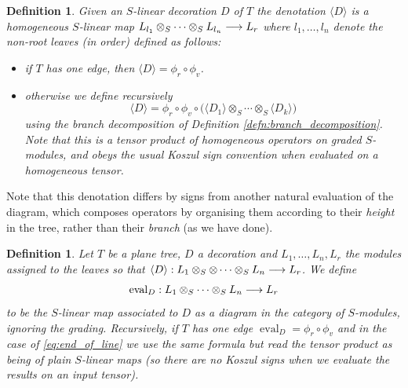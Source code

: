 \documentclass[english,letter paper,12pt,leqno]{article}
\theoremstyle{example}
\newtheorem{definition}[theorem]{Definition}
\numberwithin{equation}{section}
\def\be{\begin{equation}}
\def\ee{\end{equation}}
\begin{document}
\begin{definition} Given an $S$-linear decoration $D$ of $T$ the \emph{denotation} $\langle D \rangle$ is a homogeneous $S$-linear map $L_{l_1} \otimes_S \cdots \otimes_S L_{l_n} \longrightarrow L_r$ where $l_1,\ldots,l_n$ denote the non-root leaves (in order) defined as follows:
\begin{itemize}
\item if $T$ has one edge, then $\langle D \rangle = \phi_r \circ \phi_v$.
\item otherwise we define recursively
\be\label{eq:end_of_line}
\langle D \rangle = \phi_r \circ \phi_v \circ \Big( \langle D_1 \rangle \otimes_S \cdots \otimes_S \langle D_k \rangle \Big)
\ee
using the branch decomposition of Definition \ref{defn:branch_decomposition}. Note that this is a tensor product of homogeneous operators on graded $S$-modules, and obeys the usual Koszul sign convention when evaluated on a homogeneous tensor.
\end{itemize}
\end{definition}

Note that this denotation differs by signs from another natural evaluation of the diagram, which composes operators by organising them according to their \emph{height} in the tree, rather than their \emph{branch} (as we have done).

\begin{definition}\label{defn:evaluation_tree} Let $T$ be a plane tree, $D$ a decoration and $L_1,\ldots,L_n,L_r$ the modules assigned to the leaves so that $\langle D \rangle: L_1 \otimes_S \otimes \cdots \otimes_S L_n \longrightarrow L_r$. We define
\[
\operatorname{eval}_D: L_1 \otimes_S \cdots \otimes_S L_n \longrightarrow L_r
\]
to be the $S$-linear map associated to $D$ as a diagram in the category of $S$-modules, \emph{ignoring the grading}. Recursively, if $T$ has one edge $\operatorname{eval}_D = \phi_r \circ \phi_v$ and in the case of \eqref{eq:end_of_line} we use the same formula but read the tensor product as being of plain $S$-linear maps (so there are no Koszul signs when we evaluate the results on an input tensor).
\end{definition}
\end{document}
